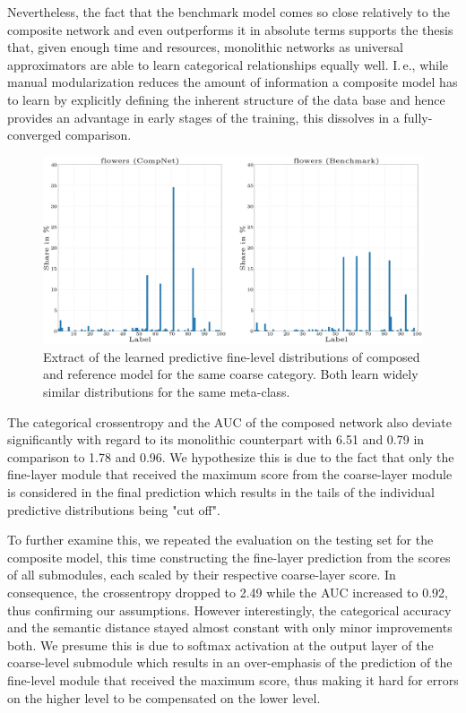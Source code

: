 Nevertheless, the fact that the benchmark model comes so close relatively to the composite network and even outperforms it in absolute terms supports the thesis that, given enough time and resources, monolithic networks as universal approximators are able to learn categorical relationships equally well. I.\,e., while manual modularization reduces the amount of information a composite model has to learn by explicitly defining the inherent structure of the data base and hence provides an advantage in early stages of the training, this dissolves in a fully-converged comparison.

\begin{figure}[b!]
    \centering
	    \includegraphics[width=\textwidth, trim=0 0 0 -50, clip]{thesis/graphics/diagrams/cifar100/cifar100_compnet_benchmark_dist_pred_fine_flower_print.jpg}
    \caption{Extract of the learned predictive fine-level distributions of composed and reference model for the same coarse category. Both learn widely similar distributions for the same meta-class.}
    \label{fig:experiments_cifar100_results_predictive_distribution_compnet_benchmark_fine_per_coarse_ground_truth}
\end{figure}

The categorical crossentropy and the AUC of the composed network also deviate significantly with regard to its monolithic counterpart with 6.51 and 0.79 in comparison to 1.78 and 0.96. We hypothesize this is due to the fact that only the fine-layer module that received the maximum score from the coarse-layer module is considered in the final prediction which results in the tails of the individual predictive distributions being "cut off".

To further examine this, we repeated the evaluation on the testing set for the composite model, this time constructing the fine-layer prediction from the scores of all submodules, each scaled by their respective coarse-layer score. In consequence, the crossentropy dropped to 2.49 while the AUC increased to 0.92, thus confirming our assumptions. However interestingly, the categorical accuracy and the semantic distance stayed almost constant with only minor improvements both. We presume this is due to softmax activation at the output layer of the coarse-level submodule which results in an over-emphasis of the prediction of the fine-level module that received the maximum score, thus making it hard for errors on the higher level to be compensated on the lower level.

